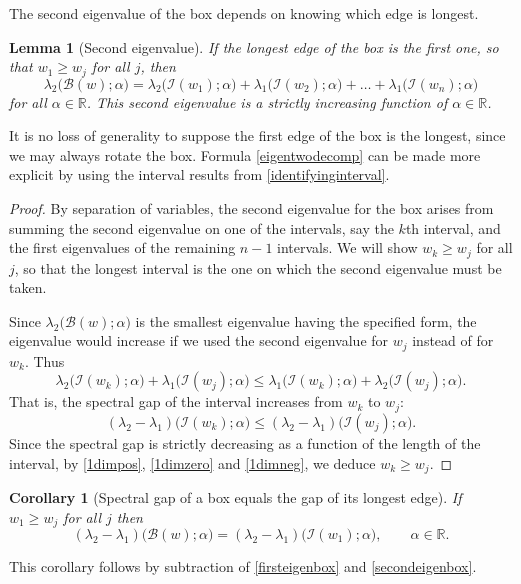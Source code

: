 \documentclass[12pt,reqno]{amsart}
\newtheorem{lemma}[lemma]{Lemma}
\newtheorem{corollary}[corollary]{Corollary}
\theoremstyle{definition}
\newcommand{\R}{{\mathbb R}}
\begin{document}
The second eigenvalue of the box depends on knowing which edge is longest. 
%
\begin{lemma}[Second eigenvalue] \label{secondeigenbox}
If the longest edge of the box is the first one, so that $w_1 \geq w_j$ for all $j$, then 
%
\begin{equation} \label{eigentwodecomp}
\lambda_2\big( \mathcal{B}(w) ; \alpha \big) = \lambda_2\big( \mathcal{I}(w_1) ; \alpha \big) + \lambda_1\big( \mathcal{I}(w_2) ; \alpha \big) + \dots + \lambda_1\big( \mathcal{I}(w_n) ; \alpha \big) 
\end{equation}
%
for all $\alpha \in \R$. This second eigenvalue is a strictly increasing function of $\alpha \in \R$. 
\end{lemma}
%
It is no loss of generality to suppose the first edge of the box is the longest, since we may always rotate the box. Formula \eqref{eigentwodecomp} can be made more explicit by using the interval results from \autoref{identifyinginterval}. 
%
\begin{proof}
By separation of variables, the second eigenvalue for the box arises from summing the second eigenvalue on one of the intervals, say the $k$th interval, and the first eigenvalues of the remaining $n-1$ intervals. We will show $w_k \geq w_j$ for all $j$, so that the longest interval is the one on which the second eigenvalue must be taken. 

Since $\lambda_2\big( \mathcal{B}(w) ; \alpha \big)$ is the smallest eigenvalue having the specified form, the eigenvalue would increase if we used the second eigenvalue for $w_j$ instead of for $w_k$. Thus
\[
\lambda_2\big( \mathcal{I}(w_k) ; \alpha \big) + \lambda_1\big( \mathcal{I}(w_j) ; \alpha \big) 
\leq 
\lambda_1\big( \mathcal{I}(w_k) ; \alpha \big) + \lambda_2\big( \mathcal{I}(w_j) ; \alpha \big) .
\]
That is, the spectral gap of the interval increases from $w_k$ to $w_j$: 
\[
(\lambda_2-\lambda_1)\big( \mathcal{I}(w_k) ; \alpha \big) \leq
(\lambda_2-\lambda_1)\big( \mathcal{I}(w_j) ; \alpha \big) .
\]
Since the spectral gap is strictly decreasing as a function of the length of the interval, by \autoref{1dimpos}, \autoref{1dimzero} and \autoref{1dimneg}, we deduce $w_k \geq w_j$.
\end{proof}

%
\begin{corollary}[Spectral gap of a box equals the gap of its longest edge] \label{boxgap}
If $w_1 \geq w_j$ for all $j$ then 
\[
(\lambda_2-\lambda_1)\big( \mathcal{B}(w) ; \alpha \big) = (\lambda_2-\lambda_1)\big( \mathcal{I}(w_1) ; \alpha \big) , \qquad \alpha \in \R .
\]
\end{corollary}
%
This corollary follows by subtraction of \autoref{firsteigenbox} and \autoref{secondeigenbox}. 
\end{document}
